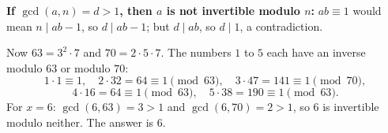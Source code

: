 \textbf{If $\gcd(a,n)=d>1$, then $a$ is not invertible modulo $n$:} $ab\equiv1$ would mean $n\mid ab-1$, so $d\mid ab-1$; but $d\mid ab$, so $d\mid1$, a contradiction.

Now $63=3^2\cdot7$ and $70=2\cdot5\cdot7$. The numbers $1$ to $5$ each have an inverse modulo $63$ or modulo $70$:
\[1\cdot1\equiv1,\quad 2\cdot32=64\equiv1\pmod{63},\quad 3\cdot47=141\equiv1\pmod{70},\]
\[4\cdot16=64\equiv1\pmod{63},\quad 5\cdot38=190\equiv1\pmod{63}.\]
For $x=6$: $\gcd(6,63)=3>1$ and $\gcd(6,70)=2>1$, so $6$ is invertible modulo neither. The answer is $\boxed{6}$.
